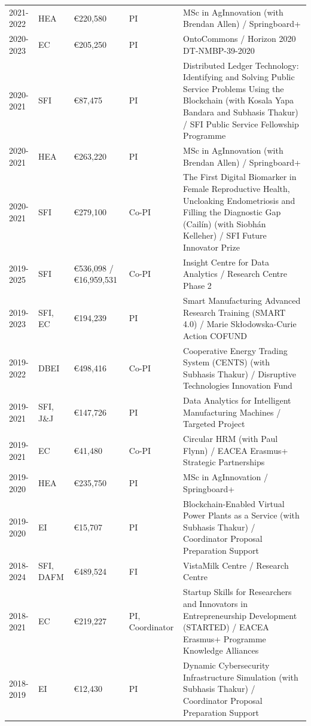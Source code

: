 \documentclass[10pt,a4paper]{res} %
\begin{document}
\begin{resume}
\begin{longtable}{ p{2 cm} | p{2 cm} | p{2 cm} | p{2 cm} | p{7 cm} }
2021-2022 & HEA & \euro{}220,580 & PI & MSc in AgInnovation (with Brendan Allen) / Springboard+ \\
2020-2023 & EC & \euro{}205,250 & PI & OntoCommons / Horizon 2020 DT-NMBP-39-2020 \\
2020-2021 & SFI & \euro{}87,475 & PI & Distributed Ledger Technology: Identifying and Solving Public Service Problems Using the Blockchain (with Kosala Yapa Bandara and Subhasis Thakur) / SFI Public Service Fellowship Programme \\
2020-2021 & HEA & \euro{}263,220 & PI & MSc in AgInnovation (with Brendan Allen) / Springboard+ \\
2020-2021 & SFI & \euro{}279,100 & Co-PI & The First Digital Biomarker in Female Reproductive Health, Uncloaking Endometriosis and Filling the Diagnostic Gap (Cail\'{i}n) (with Siobh\'{a}n Kelleher) / SFI Future Innovator Prize \\
2019-2025 & SFI & \euro{}536,098 / \euro{}16,959,531 & Co-PI & Insight Centre for Data Analytics / Research Centre Phase 2 \\
2019-2023 & SFI, EC & \euro{}194,239 & PI & Smart Manufacturing Advanced Research Training (SMART 4.0) / Marie Sk\l{}odowska-Curie Action COFUND \\
2019-2022 & DBEI & \euro{}498,416 & Co-PI & Cooperative Energy Trading System (CENTS) (with Subhasis Thakur) / Disruptive Technologies Innovation Fund \\
2019-2021 & SFI, J\&J & \euro{}147,726 & PI & Data Analytics for Intelligent Manufacturing Machines / Targeted Project \\
2019-2021 & EC & \euro{}41,480 & Co-PI & Circular HRM (with Paul Flynn) / EACEA Erasmus+ Strategic Partnerships \\
2019-2020 & HEA & \euro{}235,750 & PI & MSc in AgInnovation / Springboard+ \\
2019-2020 & EI & \euro{}15,707 & PI & Blockchain-Enabled Virtual Power Plants as a Service (with Subhasis Thakur) / Coordinator Proposal Preparation Support \\
2018-2024 & SFI, DAFM & \euro{}489,524 & FI & VistaMilk Centre / Research Centre \\
2018-2021 & EC & \euro{}219,227 & PI, Coordinator & Startup Skills for Researchers and Innovators in Entrepreneurship Development (STARTED) / EACEA Erasmus+ Programme Knowledge Alliances \\
2018-2019 & EI & \euro{}12,430 & PI & Dynamic Cybersecurity Infrastructure Simulation (with Subhasis Thakur) / Coordinator Proposal Preparation Support \\

\end{longtable}
\end{resume}
\end{document}
